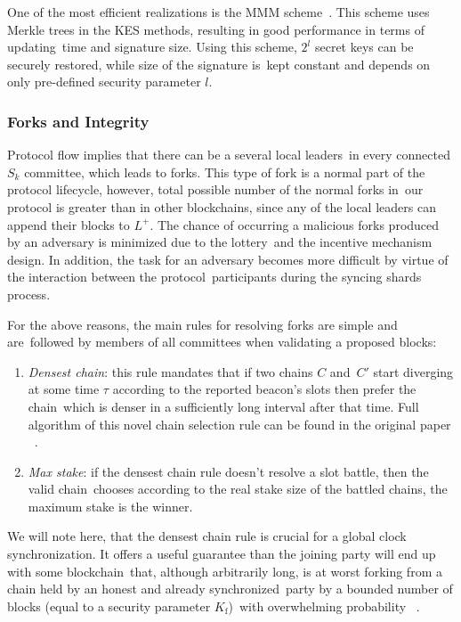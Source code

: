 One of the most efficient realizations is the MMM scheme~\cite{Malkin2002}.
This scheme uses Merkle trees in the KES methods, resulting in good performance in terms of updating\
time and signature size.
Using this scheme, $2^l$ secret keys can be securely restored, while size of the signature is\
kept constant and depends on only pre-defined security parameter $l$.

\subsubsection{Forks and Integrity}\label{subsubsec:resolving-forks}

Protocol flow implies that there can be a several local leaders\
in every connected $S_k$ committee, which leads to forks.
This type of fork is a normal part of the protocol lifecycle, however, total possible number of the normal forks in\
our protocol is greater than in other blockchains, since any of the local leaders can append their blocks to $L^+$.
The chance of occurring a malicious forks produced by an adversary is minimized due to the lottery\
and the incentive mechanism design.
In addition, the task for an adversary becomes more difficult by virtue of the interaction between the protocol\
participants during the syncing shards process.

For the above reasons, the main rules for resolving forks are simple and are\
followed by members of all committees when validating a proposed blocks:
\begin{enumerate}
    \item \textit{Densest chain}: this rule mandates that if two chains $C$ and\
    $C'$ start diverging at some time $\tau$ according to the reported beacon's slots then prefer the chain\
    which is denser in a suﬃciently long interval after that time.
    Full algorithm of this novel chain selection rule can be found in the original paper ~\cite{Badertscher2018}.
    \item \textit{Max stake}: if the densest chain rule doesn't resolve a slot battle, then the valid chain\
    chooses according to the real stake size of the battled chains, the maximum stake is the winner.
\end{enumerate}
We will note here, that the densest chain rule is crucial for a global clock synchronization.
It offers a useful guarantee than the joining party will end up with some blockchain\
that, although arbitrarily long, is at worst forking from a chain held by an honest and already synchronized\
party by a bounded number of blocks (equal to a security parameter $K_{\text{f}}$)\
with overwhelming probability ~\cite{cryptoeprint:2019/838}.

